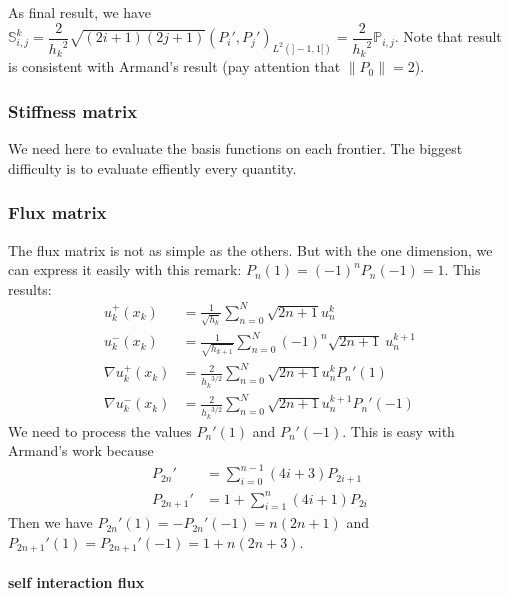 \documentclass[a4paper,10pt]{article}
\begin{document}
As final result, we have $\mathbb{S}_{i,j}^k = \dfrac{2}{{h_k}^2} \sqrt{(2i+1)(2j+1)} \left( P_i' , 
P_j' \right)_{L^2(]-1,1[)} = \dfrac{2}{{h_k}^2} \mathbb{P}_{i,j}$. Note that result is consistent 
with Armand's result (pay attention that $\|P_0\| = 2$).

\subsubsection{Stiffness matrix}

We need here to evaluate the basis functions on each frontier. The biggest difficulty is to 
evaluate effiently every quantity.

\iffalse 

\subsubsection{Flux matrix}

The flux matrix is not as simple as the others. But with the one dimension, we can express it 
easily with this remark: $P_n(1) = (-1)^n P_n(-1) = 1$. This results:
\begin{align*}
 u^+_k(x_k) &= \frac{1}{\sqrt{h_k}} \sum_{n=0}^N \sqrt{2n+1} u_n^k\\
 u^-_k(x_k) &= \frac{1}{\sqrt{h_{k+1}}} \sum_{n=0}^N (-1)^n \sqrt{2n+1}\ u_n^{k+1}\\
 \nabla u_k^+ (x_k) &= \frac{2}{{h_k}^{3/2}} \sum_{n=0}^N \sqrt{2n+1} u_n^k P_n'(1) \\
 \nabla u_k^- (x_k) &= \frac{2}{{h_k}^{3/2}} \sum_{n=0}^N \sqrt{2n+1} u_n^{k+1} P_n'(-1)
\end{align*}
We need to process the values $P_n'(1)$ and $P_n'(-1)$. This is easy with Armand's work because
\begin{align*}
 P_{2n}' &= \sum_{i=0}^{n-1} (4i+3) P_{2i+1} \\
 P_{2n+1}' &= 1 + \sum_{i=1}^{n} (4i+1) P_{2i}
\end{align*}
Then we have $P_{2n}'(1) = -P_{2n}'(-1) = n(2n+1)$ and $P_{2n+1}'(1) = P_{2n+1}'(-1) = 1 + n(2n+3)$.

\paragraph{self interaction flux}
\end{document}
